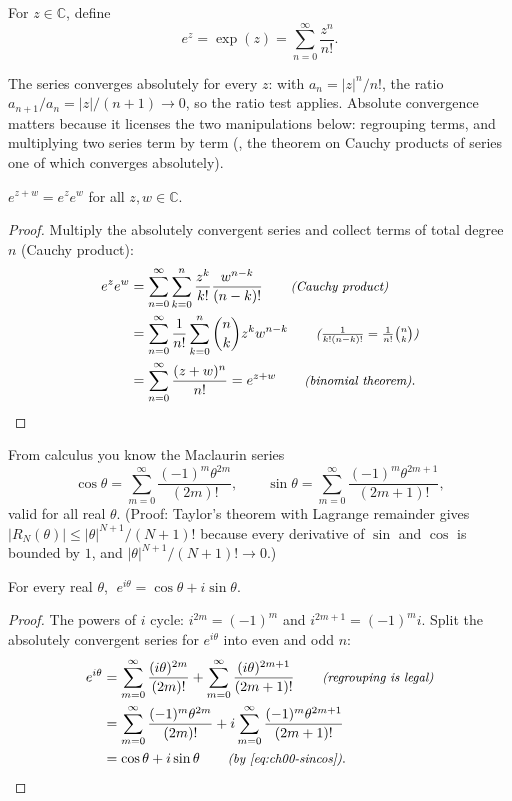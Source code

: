 \begin{definition}\label{def:ch00-exp}
For $z\in\mathbb{C}$, define
\[
  e^z = \exp(z) = \sum_{n=0}^{\infty}\frac{z^n}{n!}.
\]
\end{definition}

The series converges absolutely for every $z$: with $a_n = |z|^n/n!$, the
ratio $a_{n+1}/a_n = |z|/(n+1)\to 0$, so the ratio test applies. Absolute
convergence matters because it licenses the two manipulations below:
regrouping terms, and multiplying two series term by term
(\textcite[Ch.~3]{Rudin}, the theorem on Cauchy products of series one of
which converges absolutely).

\begin{theorem}\label{thm:ch00-exp-add}
$e^{z+w} = e^z e^w$ for all $z,w\in\mathbb{C}$.
\end{theorem}
\begin{proof}
Multiply the absolutely convergent series and collect terms of total degree
$n$ (Cauchy product):
\begin{align*}
  e^z e^w &= \sum_{n=0}^{\infty}\sum_{k=0}^{n}\frac{z^k}{k!}\frac{w^{n-k}}{(n-k)!}
     \qquad\text{\small\itshape(Cauchy product)}\\
  &= \sum_{n=0}^{\infty}\frac{1}{n!}\sum_{k=0}^{n}\binom{n}{k}z^k w^{n-k}
     \qquad\text{\small\itshape($\tfrac{1}{k!(n-k)!} = \tfrac{1}{n!}\tbinom nk$)}\\
  &= \sum_{n=0}^{\infty}\frac{(z+w)^n}{n!} = e^{z+w}
     \qquad\text{\small\itshape(binomial theorem)}. \qedhere
\end{align*}
\end{proof}

From calculus you know the Maclaurin series
\begin{equation}\label{eq:ch00-sincos}
  \cos\theta = \sum_{m=0}^\infty \frac{(-1)^m\theta^{2m}}{(2m)!},\qquad
  \sin\theta = \sum_{m=0}^\infty \frac{(-1)^m\theta^{2m+1}}{(2m+1)!},
\end{equation}
valid for all real $\theta$. (Proof: Taylor's theorem with Lagrange remainder
gives $|R_N(\theta)|\le |\theta|^{N+1}/(N+1)!$ because every derivative of
$\sin$ and $\cos$ is bounded by $1$, and $|\theta|^{N+1}/(N+1)!\to 0$.)

\begin{theorem}\label{thm:ch00-euler}
For every real $\theta$, $\;e^{i\theta} = \cos\theta + i\sin\theta$.
\end{theorem}
\begin{proof}
The powers of $i$ cycle: $i^{2m} = (-1)^m$ and $i^{2m+1} = (-1)^m i$. Split the
absolutely convergent series for $e^{i\theta}$ into even and odd $n$:
\begin{align*}
  e^{i\theta} &= \sum_{m=0}^{\infty}\frac{(i\theta)^{2m}}{(2m)!}
               + \sum_{m=0}^{\infty}\frac{(i\theta)^{2m+1}}{(2m+1)!}
     \qquad\text{\small\itshape(regrouping is legal)}\\
  &= \sum_{m=0}^{\infty}\frac{(-1)^m\theta^{2m}}{(2m)!}
   + i\sum_{m=0}^{\infty}\frac{(-1)^m\theta^{2m+1}}{(2m+1)!}\\
  &= \cos\theta + i\sin\theta \qquad\text{\small\itshape(by \eqref{eq:ch00-sincos})}. \qedhere
\end{align*}
\end{proof}

